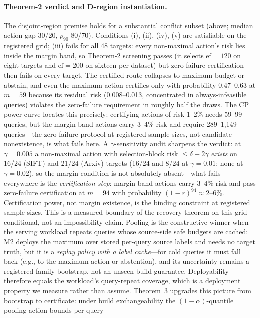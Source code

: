\documentclass{article}
\begin{document}
\paragraph{Theorem-2 verdict and D-region instantiation.}
The disjoint-region premise holds for a substantial conflict subset (above; median action gap 30/20,
$p_{90}$ 80/70).
Conditions (i), (ii), (iv), (v) are satisfiable on the registered grid; (iii) fails for all 48 targets:
every non-maximal action's risk lies inside the margin band, so Theorem-2 screening passes (it selects
$\mathrm{ef}{=}120$ on eight targets and $\mathrm{ef}{=}200$ on sixteen per dataset) but zero-failure
certification then fails on every target. The certified route collapses to
maximum-budget-or-abstain, and even the maximum action certifies only with probability 0.47--0.63 at
$m=59$ because its residual risk (0.008--0.013, concentrated in always-infeasible queries) violates the
zero-failure requirement in roughly half the draws. The CP power curve locates this precisely: certifying
actions of risk 1--2\% needs 59--99 queries, but the margin-band actions carry 3--4\% risk and require
289--1{,}149 queries---the zero-failure protocol at registered sample sizes, not candidate nonexistence,
is what fails here. A $\gamma$-sensitivity audit sharpens the verdict: at
$\gamma{=}0.005$ a non-maximal action with selection-block risk $\le\delta-2\gamma$ \emph{exists} on
16/24 (SIFT) and 21/24 (Arxiv) targets (16/24 and 8/24 at $\gamma{=}0.01$; none at $\gamma{=}0.02$), so
the margin condition is not absolutely absent---what fails everywhere is the \emph{certification step}:
margin-band actions carry 3--4\% risk and pass zero-failure certification at $m{=}94$ with probability
$(1-r)^{94}\approx2$--$6\%$. Certification power, not margin existence, is the binding constraint at
registered sample sizes. This is a measured boundary of the recovery theorem on this grid---conditional,
not an impossibility claim. Pooling is the constructive winner when the serving workload repeats queries whose source-side safe
budgets are cached: M2 deploys the maximum over stored per-query source labels and needs no target truth,
but it is a \emph{replay policy with a label cache}---for cold queries it must fall back (e.g., to the
maximum action or abstention), and its uncertainty remains a registered-family bootstrap, not an
unseen-build guarantee. Deployability therefore equals the workload's query-repeat coverage, which is a
deployment property we measure rather than assume. Theorem~3 upgrades this picture from bootstrap to
certificate: under build exchangeability the $(1{-}\alpha)$-quantile pooling action bounds per-query
\end{document}
